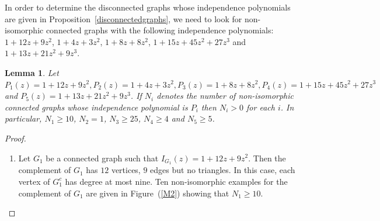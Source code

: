 \documentclass[12pt,a4paper]{article}
\theoremstyle{plain}
\newtheorem{lemma}{Lemma}
\numberwithin{equation}{section}
\begin{document}
In order to determine the disconnected graphs whose independence polynomials are given in Proposition~\ref{disconnectedgraphs}, we need to look for  non-isomorphic connected graphs with the following independence polynomials:  $1+12z+9z^2$,  $1+4z+3z^2$, $1+8z+8z^2$, $1+15z+45z^2+27z^3$ and $1+13z+21z^2+9z^3$.
\begin{lemma}
	Let $P_1(z)= 1+12z+9z^2, P_2 (z)=1+4z+3z^2, P_3(z)=1+8z+8z^2, P_4 (z)=1+15z+45z^2+27z^3$ and $ P_5 (z)=1+13z+21z^2+9z^3 $. If $N_i$ denotes the number of non-isomorphic connected graphs whose independence polynomial is $P_i$ then $N_i >0$ for each $i$. In particular,  $N_1 \geq 10$,  $N_2 = 1$, $N_3 \geq 25$, $N_4 \geq 4$ and  $N_5 \geq 5$.
 \label{examples-disconnected}
\end{lemma}
\begin{proof}
	\begin{enumerate}
			
		\item  Let \(G_1\) be a connected graph such that \(I_{G_1}(z)=1+12z+9z^2\). Then  the complement of \(G_1\) has $12$ vertices,  \(9\) edges but no triangles. In this case,  each  vertex of $G_1^c$ has degree at most nine. Ten  non-isomorphic examples for the complement of   \(G_1\) are given in Figure~(\ref{M2}) showing that $N_1 \geq 10$.
		

\end{enumerate}
\end{proof}
\end{document}
